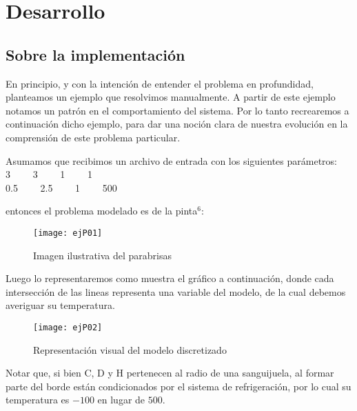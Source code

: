 \section{Desarrollo}

\subsection{Sobre la implementación}
En principio, y con la intención de entender el problema en profundidad, planteamos un ejemplo que resolvimos manualmente. A partir de este ejemplo
notamos un patrón en el comportamiento del sistema. Por lo tanto recrearemos a continuación dicho ejemplo, para dar una noción clara de nuestra 
evolución en la comprensión de este problema particular.

Asumamos que recibimos un archivo de entrada con los siguientes parámetros:\\

3 \ \ \ \   3  \ \ \ \ 1 \ \ \ \ 1\\
0.5  \ \ \ \ 2.5 \ \ \ \ 1  \ \ \ \ 500

entonces el problema modelado es de la pinta$^6$:

\begin{figure}[]
    \texttt{[image: ejP01]}
    \caption{Imagen ilustrativa del parabrisas}
\end{figure}

Luego lo representaremos como muestra el gráfico a continuación, donde cada intersección de las lineas representa una variable del modelo, de la cual
debemos averiguar su temperatura.

\begin{figure}[]
    \texttt{[image: ejP02]}
    \caption{Representación visual del modelo discretizado}
\end{figure}

Notar que, si bien C, D y H pertenecen al radio de una sanguijuela, al formar parte del borde están condicionados por el sistema de refrigeración,
por lo cual su temperatura es $-100$ en lugar de $500$.

